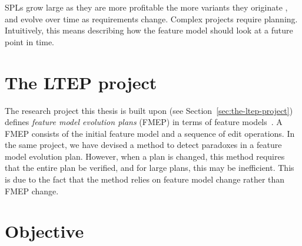 SPLs grow large as they are more profitable the more variants they originate \cite{book:introduction-to-spl}, %
and evolve over time as requirements change. Complex projects require planning. Intuitively, this means describing how the feature model should look at a future point in time.   

\section{The LTEP project}
\label{sec:the-ltep-project}

The research project this thesis is built upon (see Section~\vref{sec:the-ltep-project}) defines \emph{feature model evolution plans} (FMEP) in terms of feature models~\cite{art:consistency-preserving-evolution-planning}.  A FMEP consists of the initial feature model and a sequence of edit operations. In the same project, we have devised a method to detect paradoxes in a feature model evolution plan.  However, when a plan is changed, this method requires that the entire plan be verified, and for large plans, this may be inefficient. This is due to the fact that the method relies on feature model change rather than FMEP change. 

\section{Objective}
\label{sec:objective}

